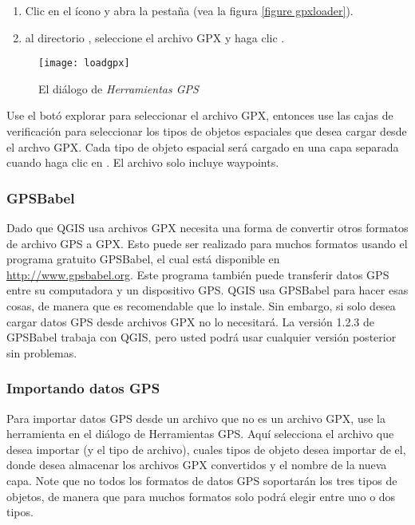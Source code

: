 \begin{enumerate}
\item Clic en el ícono  y abra la
pestaña  (vea la figura \ref{figure gpxloader}).
\item {} al directorio ,
seleccione el archivo GPX  y haga clic .
\end{enumerate}

\begin{figure}[ht]
   \begin{center}
\caption{\label{gpxloader}El diálogo de \emph{Herramientas GPS} \nixcaption}
\texttt{[image: loadgpx]}
\end{center}
\end{figure}

Use el botó explorar \browsebutton para seleccionar el archivo GPX, entonces use las
cajas de verificación para seleccionar los tipos de objetos espaciales que desea cargar desde el archvo GPX.
Cada tipo de objeto espacial será cargado en una capa separada cuando haga clic en .
El archivo  solo incluye waypoints.

\subsubsection{GPSBabel}

Dado que QGIS usa archivos GPX necesita una forma de convertir otros formatos de archivo GPS a GPX.
Esto puede ser realizado para muchos formatos usando el programa gratuito GPSBabel, el cual está disponible en \url{http://www.gpsbabel.org}.
Este programa también puede transferir datos GPS entre su computadora y un dispositivo GPS.
QGIS usa GPSBabel para hacer esas cosas, de manera que es recomendable que lo instale.
Sin embargo, si solo desea cargar datos GPS desde archivos GPX no lo necesitará.
La versión 1.2.3 de GPSBabel trabaja con QGIS, pero usted podrá usar cualquier versión posterior sin problemas.


\subsubsection{Importando datos GPS}

Para importar datos GPS desde un archivo que no es un archivo GPX, use la herramienta  en el diálogo de Herramientas GPS.
Aquí selecciona el archivo que desea importar (y el tipo de archivo), cuales tipos de objeto desea importar de el, donde desea almacenar los archivos GPX convertidos y el nombre de la nueva capa. Note que no todos los formatos de datos GPS soportarán los tres tipos de objetos, de manera que para muchos formatos solo podrá elegir entre uno o dos tipos.  


